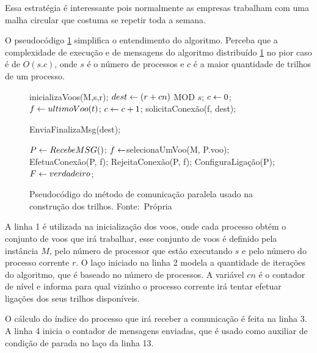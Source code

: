 Essa estratégia é interessante pois normalmente as empresas trabalham com uma
malha circular que costuma se repetir toda a semana.

O pseudocódigo \ref{alg:metodoparalel} simplifica o entendimento do algoritmo.
Perceba que a complexidade de execução e de mensagens do algoritmo distribuído
\ref{alg:metodoparalel} no pior caso é de $O(s.c)$, onde $s$ é o número de
processos e $c$ é a maior quantidade de trilhos de um processo.


\begin{figure}[h]
\caption{Pseudocódigo do método de comunicação paralela usado na construção dos
trilhos.
\newline
\mbox{Fonte: Própria}}\label{alg:metodoparalel}
\begin{programma}

\STATE inicializaVoos(M,s,r);
\STATE $dest \leftarrow (r + cn)$ MOD $s$;
\STATE $c \leftarrow 0$;
\STATE $f \leftarrow ultimoVoo(t)$;
	\STATE $c \leftarrow c + 1$;
	\STATE solicitaConexão(f, dest);
	\ENDIF
\ENDFOR

\STATE EnviaFinalizaMsg(dest);

	\STATE $P \leftarrow RecebeMSG()$;
		\STATE $f \leftarrow $selecionaUmVoo(M, P.voo);
			\STATE EfetuaConexão(P, f);
		\ELSE
			\STATE RejeitaConexão(P, f);
		\ENDIF
		\STATE ConfiguraLigação(P);
		\STATE $F \leftarrow verdadeiro$;
	\ENDIF 
	
\ENDWHILE
\ENDFOR

\ENDALGORITHM
\end{programma}
\end{figure} 


A linha 1 é utilizada na inicialização dos voos, onde cada processo obtém o
conjunto de voos que irá trabalhar, esse conjunto de voos é definido pela
instância $M$, pelo número de processor que estão executando $s$ e pelo número
do processo corrente $r$. O laço iniciado na linha 2 modela a quantidade de
iterações do algoritmo, que é baseado no número de processos. A variável $cn$ é
o contador de nível e informa para qual vizinho o processo corrente irá tentar
efetuar ligações dos seus trilhos disponíveis.

O cálculo do índice do processo que irá receber a comunicação é feita na linha
3. A linha 4 inicia o contador de mensagens enviadas, que é usado como auxiliar
de condição de parada no laço da linha 13.

